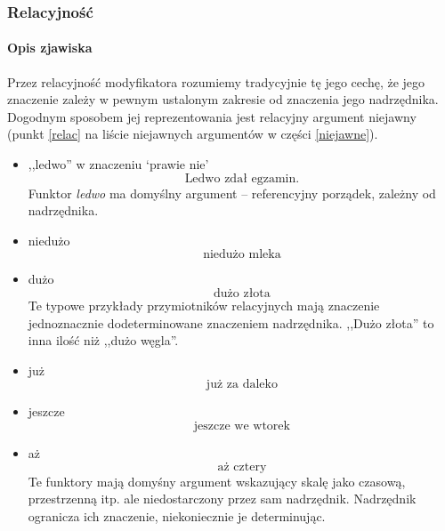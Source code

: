 \documentclass[12pt]{mwart}
\theoremstyle{remark}
\begin{document}
\subsubsection{Relacyjność}
\paragraph{Opis zjawiska} %
\label{sub:opis_zjawiska1}


Przez relacyjność modyfikatora rozumiemy tradycyjnie tę jego cechę, że jego znaczenie zależy w pewnym ustalonym zakresie od znaczenia jego nadrzędnika. Dogodnym sposobem jej reprezentowania jest relacyjny argument niejawny (punkt \ref{relac} na liście niejawnych argumentów w części \ref{niejawne}).

\begin{itemize}
\item ,,ledwo'' w znaczeniu `prawie nie'
\begin{equation}
	\text{Ledwo zdał egzamin}.
\end{equation}
Funktor \emph{ledwo} ma domyślny argument -- referencyjny porządek, zależny od nadrzędnika.
\item niedużo
\begin{equation}
	\text{niedużo mleka}
\end{equation}
\item dużo
\begin{equation}
	\text{dużo złota}
\end{equation}
Te typowe przykłady przymiotników relacyjnych mają znaczenie jednoznacznie dodeterminowane znaczeniem nadrzędnika. 
,,Dużo złota'' to inna ilość niż ,,dużo węgla''.
\item już
\begin{equation}
	\text{już za daleko}
\end{equation}
\item jeszcze
\begin{equation}
	\text{jeszcze we wtorek}
\end{equation}
\item aż
\begin{equation}
	\text{aż cztery}
\end{equation}
Te funktory mają domyśny argument wskazujący skalę jako czasową, przestrzenną itp. ale niedostarczony przez sam nadrzędnik.
Nadrzędnik ogranicza ich znaczenie, niekoniecznie je determinując. 
\end{itemize}
\end{document}
